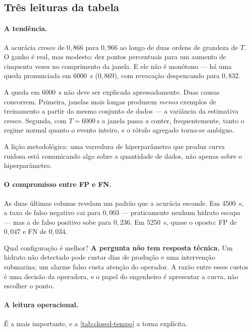 \subsection{Três leituras da tabela}

\paragraph{A tendência.} A acurácia cresce de $0{,}866$ para $0{,}966$ ao longo de duas
ordens de grandeza de $T$. O ganho é real, mas modesto: dez pontos percentuais para um
aumento de cinquenta vezes no comprimento da janela. E ele não é monótono --- há uma
queda pronunciada em \SI{6000}{\second} ($0{,}869$), com revocação despencando para
$0{,}832$.

\begin{destaque}
A queda em \SI{6000}{\second} não deve ser explicada apressadamente. Duas causas
concorrem. Primeira, janelas mais longas produzem \emph{menos} exemplos de treinamento a
partir do mesmo conjunto de dados --- a variância da estimativa cresce. Segunda, com
$T = \SI{6000}{\second}$ a janela passa a conter, frequentemente, tanto o regime normal
quanto o evento inteiro, e o rótulo agregado torna-se ambíguo.

A lição metodológica: uma varredura de hiperparâmetro que produz curva ruidosa está
comunicando algo sobre a quantidade de dados, não apenas sobre o hiperparâmetro.
\end{destaque}

\paragraph{O compromisso entre FP e FN.} As duas últimas colunas revelam um padrão que a
acurácia esconde. Em \SI{4500}{\second}, a taxa de falso negativo cai para $0{,}003$ ---
praticamente nenhum hidrato escapa --- mas a de falso positivo sobe para $0{,}236$. Em
\SI{5250}{\second}, quase o oposto: FP de $0{,}047$ e FN de $0{,}034$.

Qual configuração é melhor? \textbf{A pergunta não tem resposta técnica.} Um hidrato não
detectado pode custar dias de produção e uma intervenção submarina; um alarme falso custa
atenção do operador. A razão entre esses custos é uma decisão da operadora, e o papel do
engenheiro é apresentar a curva, não escolher o ponto.

\paragraph{A leitura operacional.} É a mais importante, e a \cref{tab:closed-tempo} a
torna explícita.

